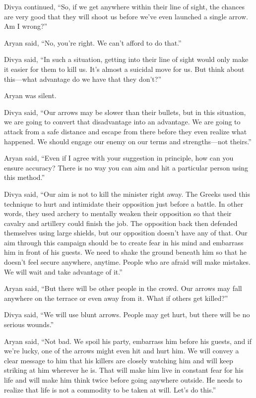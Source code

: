 Divya continued, “So, if we get anywhere within their line of sight, the chances
are very good that they will shoot us before we've even launched a single arrow.
Am I wrong?”

Aryan said, “No, you're right. We can't afford to do that.”

Divya said, “In such a situation, getting into their line of sight would only
make it easier for them to kill us. It's almost a suicidal move for us. But
think about this—what advantage do we have that they don't?”

Aryan was silent.

Divya said, “Our arrows may be slower than their bullets, but in this situation,
we are going to convert that disadvantage into an advantage. We are going to
attack from a safe distance and escape from there before they even realize what
happened. We should engage our enemy on our terms and strengths—not theirs.”

Aryan said, “Even if I agree with your suggestion in principle, how can you ensure
accuracy? There is no way you can aim and hit a particular person using this
method.”

Divya said, “Our aim is not to kill the minister right away. The Greeks used
this technique to hurt and intimidate their opposition just before a battle. In
other words, they used archery to mentally weaken their opposition so that their
cavalry and artillery could finish the job. The opposition back then defended
themselves using large shields, but our opposition doesn't have any of that. Our
aim through this campaign should be to create fear in his mind and embarrass him
in front of his guests. We need to shake the ground beneath him so that he
doesn't feel secure anywhere, anytime. People who are afraid will make mistakes.
We will wait and take advantage of it.”

Aryan said, “But there will be other people in the crowd. Our arrows may fall
anywhere on the terrace or even away from it. What if others get killed?”

Divya said, “We will use blunt arrows. People may get hurt, but there will be no
serious wounds.”

Aryan said, “Not bad. We spoil his party, embarrass him before his guests, and
if we're lucky, one of the arrows might even hit and hurt him. We will convey a
clear message to him that his killers are closely watching him and will keep
striking at him wherever he is. That will make him live in constant fear for
his life and will make him think twice before going anywhere outside. He needs to
realize that life is not a commodity to be taken at will. Let's do this.”

